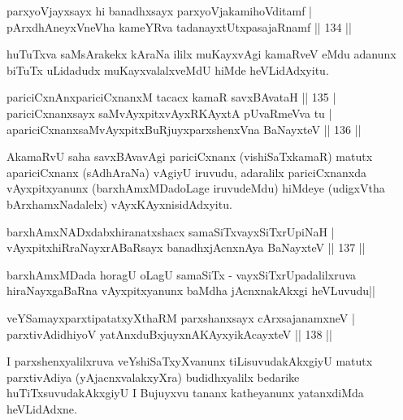 \begin{shl}
parxyoVjayxsayx hi banadhxsayx parxyoVjakamihoVditamf |\\
pArxdhAneyxVneVha kameYRva tadanayxtUtxpasajaRnamf \hfill || 134 ||
\end{shl}

\begin{artha}
huTuTxva saMsArakekx kAraNa ililx muKayxvAgi kamaRveV eMdu adanunx biTuTx uLidadudx muKayxvalalxveMdU hiMde heVLidAdxyitu.
\end{artha}

\begin{shl}
pariciCxnAnxpariciCxnanxM tacacx kamaR savxBAvataH \hfill || 135 |\\
pariciCxnanxsayx saMvAyxpitxvAyxRKAyxtA pUvaRmeVva tu |\\
apariciCxnanxsaMvAyxpitxBuRjuyxparxshenxVna BaNayxteV \hfill || 136 ||
\end{shl}

\begin{artha}
AkamaRvU saha savxBAvavAgi pariciCxnanx (vishiSaTxkamaR) matutx apariciCxnanx  (sAdhAraNa) vAgiyU iruvudu, adaralilx pariciCxnanxda vAyxpitxyanunx (barxhAmxMDadoLage iruvudeMdu) hiMdeye (udigxVtha bArxhamxNadalelx) vAyxKAyxnisidAdxyitu.
\end{artha}


\begin{shl}
barxhAmxNADxdabxhiranatxshacx samaSiTxvayxSiTxrUpiNaH |\\
vAyxpitxhiRraNayxrABaRsayx banadhxjAcnxnAya BaNayxteV \hfill || 137 ||
\end{shl}

\begin{artha}
barxhAmxMDada horagU oLagU samaSiTx - vayxSiTxrUpadalilxruva hiraNayxgaBaRna vAyxpitxyanunx baMdha jAcnxnakAkxgi heVLuvudu||
\end{artha}


\begin{shl}
veYSamayxparxtipatatxyXthaRM parxshanxsayx cArxsajanamxneV |\\
parxtivAdidhiyoV yatAnxduBxjuyxnA\s \s KAyxyikAcayxteV \hfill || 138 ||
\end{shl}

\begin{artha}
I parxshenxyalilxruva veYshiSaTxyXvanunx tiLisuvudakAkxgiyU matutx parxtivAdiya (yAjacnxvalakxyXra) budidhxyalilx bedarike huTiTxsuvudakAkxgiyU I Bujuyxvu tananx katheyanunx yatanxdiMda heVLidAdxne.
\end{artha}

